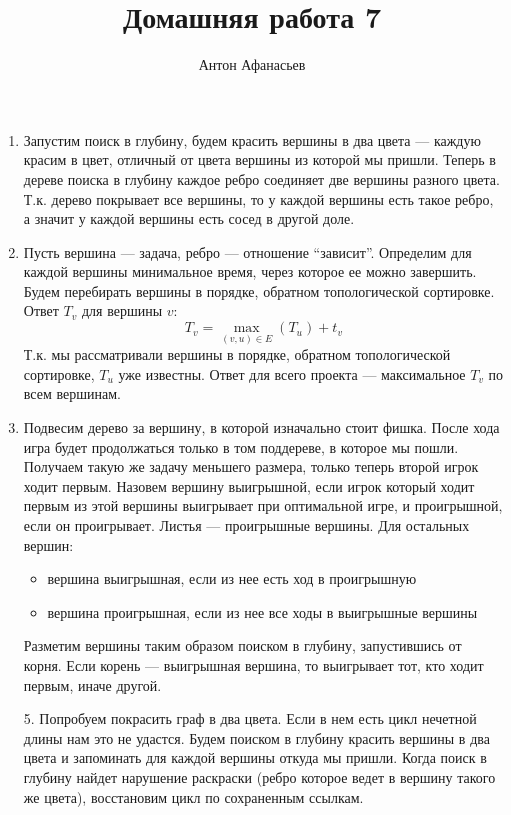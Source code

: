 \documentclass[10pt]{article}
\begin{document}
\title{Домашняя работа 7}
\author{Антон Афанасьев}
\maketitle

\begin{enumerate}

\item Запустим поиск в глубину, будем красить вершины в два цвета --- каждую красим в цвет, отличный от цвета вершины из которой мы пришли. Теперь в дереве поиска в глубину каждое ребро соединяет две вершины разного цвета. Т.к. дерево покрывает все вершины, то у каждой вершины есть такое ребро, а значит у каждой вершины есть сосед в другой доле.

\item Пусть вершина --- задача, ребро --- отношение ``зависит''. Определим для каждой вершины минимальное время, через которое ее можно завершить. Будем перебирать вершины в порядке, обратном топологической сортировке. Ответ $T_v$ для вершины $v$:
$$T_v = \max_{(v, u) \in E}(T_u) + t_v$$
Т.к. мы рассматривали вершины в порядке, обратном топологической сортировке, $T_u$ уже известны. Ответ для всего проекта --- максимальное $T_v$ по всем вершинам.

\item Подвесим дерево за вершину, в которой изначально стоит фишка. После хода игра будет продолжаться только в том поддереве, в которое мы пошли. Получаем такую же задачу меньшего размера, только теперь второй игрок ходит первым. Назовем вершину выигрышной, если игрок который ходит первым из этой вершины выигрывает при оптимальной игре, и проигрышной, если он проигрывает. Листья --- проигрышные вершины. Для остальных вершин:
	\begin{itemize}
	\item вершина выигрышная, если из нее есть ход в проигрышную
	\item вершина проигрышная, если из нее все ходы в выигрышные вершины
	\end{itemize}
Разметим вершины таким образом поиском в глубину, запустившись от корня. Если корень --- выигрышная вершина, то выигрывает тот, кто ходит первым, иначе другой.

\item[5.] Попробуем покрасить граф в два цвета. Если в нем есть цикл нечетной длины нам это не удастся. Будем поиском в глубину красить вершины в два цвета и запоминать для каждой вершины откуда мы пришли. Когда поиск в глубину найдет нарушение раскраски (ребро которое ведет в вершину такого же цвета), восстановим цикл по сохраненным ссылкам.
\end{enumerate}
\end{document}
